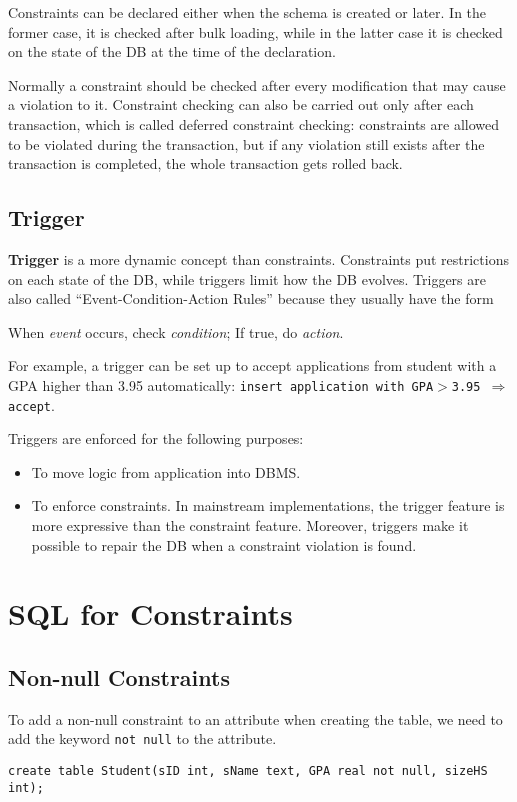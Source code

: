 Constraints can be declared either when the schema is created or later. In the former case, it is checked after bulk loading, while in the latter case it is checked on the state of the DB at the time of the declaration. 

Normally a constraint should be checked after every modification that may cause a violation to it. Constraint checking can also be carried out only after each transaction, which is called deferred constraint checking: constraints are allowed to be violated during the transaction, but if any violation still exists after the transaction is completed, the whole transaction gets rolled back. 
\subsection{Trigger}
\textbf{Trigger} is a more dynamic concept than constraints. Constraints put restrictions on each state of the DB, while triggers limit how the DB evolves. Triggers are also called ``Event-Condition-Action Rules'' because they usually have the form 
\begin{center}
When \emph{event} occurs, check \emph{condition}; If true, do \emph{action}. 
\end{center}
For example, a trigger can be set up to accept applications from student with a GPA  higher than 3.95 automatically:
\texttt{insert application with GPA$>$3.95 $\Rightarrow$ accept}.

Triggers are enforced for the following purposes:
\begin{itemize}
\item To move logic from application into DBMS.
\item To enforce constraints. In mainstream implementations, the trigger feature is more expressive than the constraint feature. Moreover, triggers make it possible to repair the DB when a constraint violation is found.
\end{itemize}
\section{SQL for Constraints}
\subsection{Non-null Constraints}
To add a non-null constraint to an attribute when creating the table, we need to add the keyword \texttt{not null} to the attribute. 
\begin{lstlisting}
create table Student(sID int, sName text, GPA real not null, sizeHS int);
\end{lstlisting}
